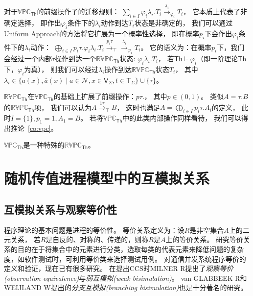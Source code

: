 对于$\mathbb{VPC}_{\mathsf{Th}}$的前缀操作子的迁移规则：
$\sum_{i\in I} \varphi_i \lambda_i. T_i\stackrel{\lambda_i}{\rightarrow}_{\varphi_i} T_i$，
它本质上代表了非确定选择，
即作出$\varphi_i$条件下的$\lambda_i$动作到达$T_i$状态是非确定的，
我们可以通过Uniform Approach的方法将它扩展为一个概率性选择，
即在概率$p_i$下会作出$\varphi_i$条件下的$\lambda_i$动作：
$\bigoplus_{i\in I} p_i\tau.\varphi_i \lambda_i. T_i\stackrel{p_i\tau}{\rightarrow}_{\top}\stackrel{\lambda_i}{\rightarrow}_{\varphi_i} T_i$。
它的语义为：在概率$p_i$下，我们会经过一个内部$\tau$操作到达一个$\mathbb{RVPC}_{\mathsf{Th}}$状态:
$\varphi_i\lambda_i.T_i$，
若$\mathsf{Th}\vdash \varphi_i$（即一阶理论$\mathsf{Th}$下，$\varphi_i$为真），
则我们可以经过$\lambda_i$操作到达$\mathbb{RVPC}_{\mathsf{Th}}$状态$T_i$， 
其中$\lambda_i \in \{a(x),\bar{a}(x)\mid a\in \mathcal{N}, x\in \mathsf{V}_\Sigma, t\in \mathsf{T}_\Sigma\}\cup \{\tau\}$。

$\mathbb{RVPC}_{\mathsf{Th}}$在$\mathbb{VPC}_{\mathsf{Th}}$的基础上扩展了前缀操作：$p\tau.$，
其中$p\in (0,1)$。
类似$A=\tau.B$的$\mathbb{RVPC}_{\mathsf{Th}}$项，
我们可以认为$A\stackrel{1\tau}{\rightarrow}_{\top} B$，
这时也满足$A=\bigoplus_{i\in I} p_i\tau.A_i$的定义，
此时$I=\{1\},p_1=1,A_1=B$。
若将$\mathbb{VPC}_{\mathsf{Th}}$中的此类内部操作同样看待，
我们可以得出推论~\ref{co:vpc}。
\begin{corollary}\label{co:vpc}
   $\mathbb{VPC}_{\mathsf{Th}}$是一种特殊的$\mathbb{RVPC}_{\mathsf{Th}}$。
\end{corollary}

\section{随机传值进程模型中的互模拟关系}

\subsection{互模拟关系与观察等价性}\label{ch:bisimulation}

   程序理论的基本问题是进程的等价性。
   等价关系定义为：设$R$是非空集合$A$上的二元关系，
   若$R$是自反的、对称的、传递的，则称$R$是$A$上的等价关系。
   研究等价关系的目的在于将集合中的元素进行分类，选取每类的代表元素来降低问题的复杂度，如软件测试时，可利用等价类来选择测试用例\cite{Equiv}。
   对通信并发系统程序等价的定义和验证，现在已有很多研究。
   在提出CCS时MILNER R提出了\textit{观察等价(observation equivalence)}与\textit{弱互模拟(weak bisimulation)}\cite{Milner_CCS}。
   van GLABBEEK R和WEIJLAND W提出的\textit{分支互模拟(branching bisimulation)}\cite{Branching_1, Branching_2}也是十分著名的研究。

